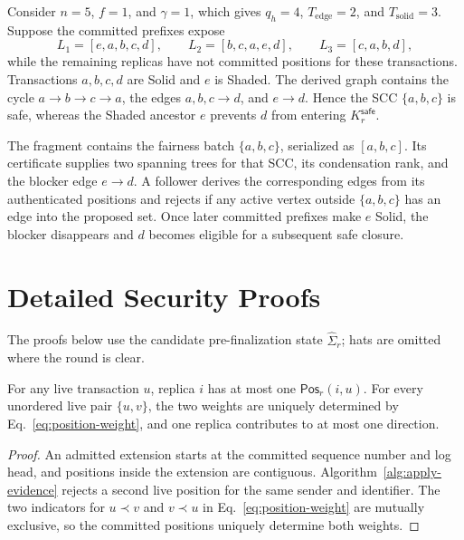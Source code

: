 Consider $n=5$, $f=1$, and $\gamma=1$, which gives $q_h=4$,
$T_{\mathrm{edge}}=2$, and $T_{\mathrm{solid}}=3$.  Suppose the committed
prefixes expose
\[
 L_1=[e,a,b,c,d],\qquad
 L_2=[b,c,a,e,d],\qquad
 L_3=[c,a,b,d],
\]
while the remaining replicas have not committed positions for these
transactions.  Transactions $a,b,c,d$ are Solid and $e$ is Shaded.  The
derived graph contains the cycle $a\to b\to c\to a$, the edges
$a,b,c\to d$, and $e\to d$.  Hence the SCC $\{a,b,c\}$ is safe, whereas the
Shaded ancestor $e$ prevents $d$ from entering $K_r^{\mathsf{safe}}$.

The fragment contains the fairness batch $\{a,b,c\}$, serialized as
$[a,b,c]$.  Its certificate supplies two spanning trees for that SCC, its
condensation rank, and the blocker edge $e\to d$.  A follower derives the
corresponding edges from its authenticated positions and rejects if any active
vertex outside $\{a,b,c\}$ has an edge into the proposed set.  Once later
committed prefixes make $e$ Solid, the blocker disappears and $d$ becomes
eligible for a subsequent safe closure.

\section{Detailed Security Proofs}
\label{app:autig-security-details}

The proofs below use the candidate pre-finalization state
$\widehat\Sigma_r$; hats are omitted where the round is clear.

\begin{lemma}
\label{lem:position-uniqueness}
For any live transaction $u$, replica $i$ has at most one
$\mathsf{Pos}_r(i,u)$.  For every unordered live pair $\{u,v\}$, the two
weights are uniquely determined by Eq.~\eqref{eq:position-weight}, and one
replica contributes to at most one direction.
\end{lemma}

\begin{proof}
An admitted extension starts at the committed sequence number and log head,
and positions inside the extension are contiguous.  Algorithm~\ref{alg:apply-evidence}
rejects a second live position for the same sender and identifier.  The two
indicators for $u\prec v$ and $v\prec u$ in Eq.~\eqref{eq:position-weight}
are mutually exclusive, so the committed positions uniquely determine both
weights.
\end{proof}

